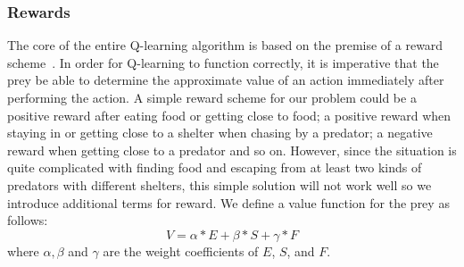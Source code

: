 \documentclass[10pt,conference,letterpaper,doublecolumn]{IEEEtran}
\begin{document}

\subsubsection{Rewards} \label{Rewards and Discussions}
The core of the entire Q-learning algorithm is based on the premise of a reward scheme~\cite{qlearn}. In order for Q-learning to function correctly, it is imperative that the prey be able to determine the approximate value of an action immediately after performing the action. A simple reward scheme for our problem could be a positive reward after eating food or getting close to food; a positive reward when staying in or getting close to a shelter when chasing by a predator; a negative reward when getting close to a predator and so on. However, since the situation is quite complicated with finding food and escaping from at least two kinds of predators with different shelters, this simple solution will not work well so we introduce additional terms for reward. We define a value function for the prey as follows:
\begin{equation} \label{V}
V = \alpha * E + \beta * S + \gamma * F
\end{equation}
where $\alpha, \beta$ and $\gamma$ are the weight coefficients of $E$, $S$, and $F$.
\end{document}
